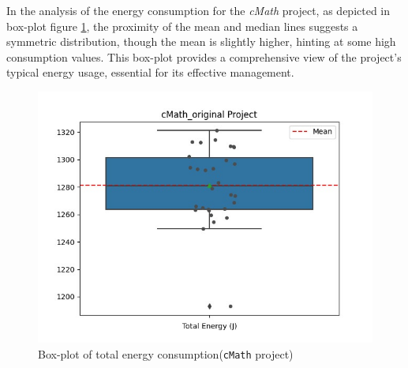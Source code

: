 \vspace{10em}
In the analysis of the energy consumption for the \textit{cMath} project, as depicted in box-plot figure \ref{fig:Boxplot of total energy consumption for cMath project}, the proximity of the mean and median lines suggests a symmetric distribution, though the mean is slightly higher, hinting at some high consumption values. %
This box-plot provides a comprehensive view of the project's typical energy usage, essential for its effective management.
\vspace{-10pt}
\begin{figure}[htbp]
  \centering
  \includegraphics[width=.49\textwidth]{img/cMath_project_energy_boxplot.jpeg}
  \caption{Box-plot of total energy consumption(\texttt{cMath} project)}
  \label{fig:Boxplot of total energy consumption for cMath project}
\end{figure}
\vspace{-10pt}